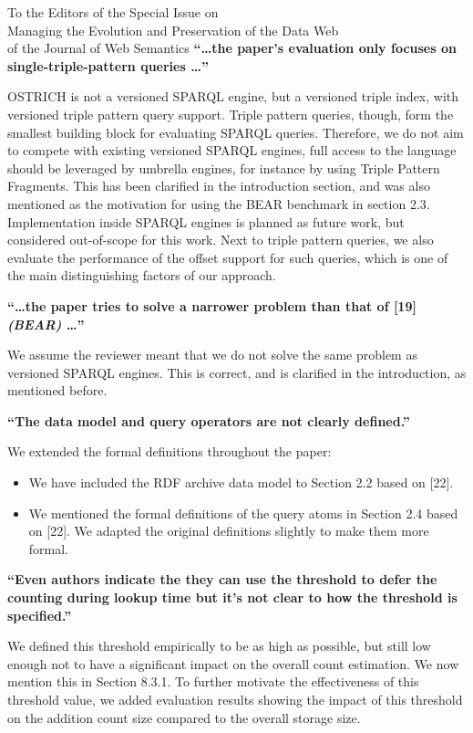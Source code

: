 \documentclass{letter}
\newcounter{section}
\begin{document}
\begin{letter}{To the Editors of the Special Issue on\\Managing the Evolution and Preservation of the Data Web\\of the Journal of Web Semantics}
\textbf{\enquote{\ldots the paper's evaluation only focuses on single-triple-pattern queries \ldots}}

OSTRICH is not a versioned SPARQL engine, but a versioned triple index,
with versioned triple pattern query support.
Triple pattern queries, though, form the smallest building block for evaluating SPARQL queries.
Therefore, we do not aim to compete with existing versioned SPARQL engines,
full access to the language should be leveraged by umbrella engines,
for instance by using Triple Pattern Fragments.
This has been clarified in the introduction section, and was also mentioned as the motivation for using the BEAR benchmark in section 2.3.
Implementation inside SPARQL engines is planned as future work, but considered out-of-scope for this work.
Next to triple pattern queries,
we also evaluate the performance of the offset support for such queries,
which is one of the main distinguishing factors of our approach.

\textbf{\enquote{\ldots the paper tries to solve a narrower problem than that of [19] \emph{(BEAR)} \ldots}}

We assume the reviewer meant that we do not solve the same problem as versioned SPARQL engines.
This is correct, and is clarified in the introduction, as mentioned before.

\textbf{\enquote{The data model and query operators are not clearly defined.}}

We extended the formal definitions throughout the paper:
\begin{itemize}
    \item We have included the RDF archive data model to Section 2.2 based on [22].
    \item We mentioned the formal definitions of the query atoms in Section 2.4 based on [22]. We adapted the original definitions slightly to make them more formal.
\end{itemize}

\textbf{\enquote{Even authors indicate the they can use the threshold to defer the counting during lookup time but it's not clear to how the threshold is specified.}}

We defined this threshold empirically to be as high as possible, but still low enough not to have a significant impact on the overall count estimation.
We now mention this in Section 8.3.1.
To further motivate the effectiveness of this threshold value,
we added evaluation results showing the impact of this threshold on the addition count size compared to the overall storage size.


\end{letter}
\end{document}
